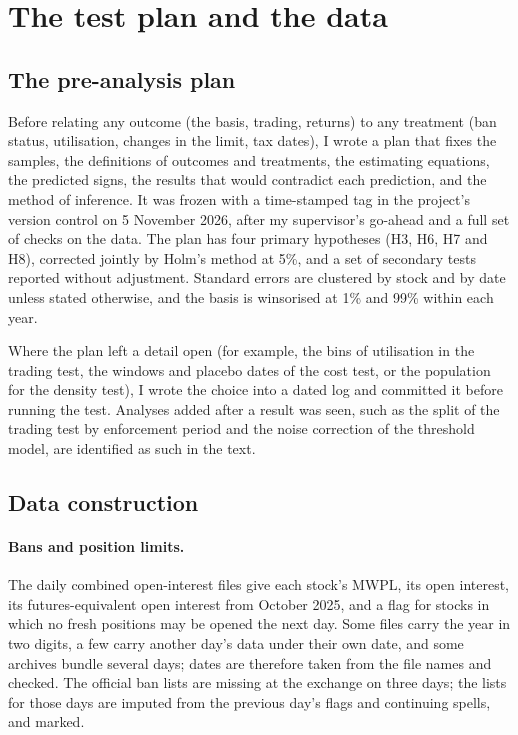 \section{The test plan and the data}\label{app:plan}

\subsection{The pre-analysis plan}
Before relating any outcome (the basis, trading, returns) to any treatment (ban status, utilisation, changes in the
limit, tax dates), I wrote a plan that fixes the samples, the definitions of outcomes and treatments, the estimating
equations, the predicted signs, the results that would contradict each prediction, and the method of inference. It was
frozen with a time-stamped tag in the project's version control on 5 November 2026, after my supervisor's go-ahead and
a full set of checks on the data. The plan has four primary hypotheses (H3, H6, H7 and H8), corrected jointly by Holm's
method at 5\%, and a set of secondary tests reported without adjustment. Standard errors are clustered by stock and by
date unless stated otherwise, and the basis is winsorised at 1\% and 99\% within each year.

Where the plan left a detail open (for example, the bins of utilisation in the trading test, the windows and placebo
dates of the cost test, or the population for the density test), I wrote the choice into a dated log and committed it
before running the test. Analyses added after a result was seen, such as the split of the trading test by enforcement
period and the noise correction of the threshold model, are identified as such in the text.

\subsection{Data construction}\label{app:data}
\paragraph{Bans and position limits.} The daily combined open-interest files give each stock's MWPL, its open interest,
its futures-equivalent open interest from October 2025, and a flag for stocks in which no fresh positions may be opened
the next day. Some files carry the year in two digits, a few carry another day's data under their own date, and some
archives bundle several days; dates are therefore taken from the file names and checked. The official ban lists are
missing at the exchange on three days; the lists for those days are imputed from the previous day's flags and continuing
spells, and marked.


